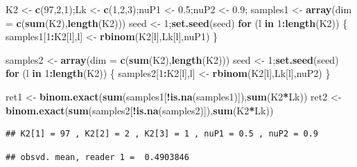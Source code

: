 \documentclass[
]{book}
\newenvironment{Shaded}{\begin{snugshade}}{\end{snugshade}}
\newcommand{\ControlFlowTok}[1]{\textcolor[rgb]{0.13,0.29,0.53}{\textbf{#1}}}
\newcommand{\DataTypeTok}[1]{\textcolor[rgb]{0.13,0.29,0.53}{#1}}
\newcommand{\DecValTok}[1]{\textcolor[rgb]{0.00,0.00,0.81}{#1}}
\newcommand{\FloatTok}[1]{\textcolor[rgb]{0.00,0.00,0.81}{#1}}
\newcommand{\KeywordTok}[1]{\textcolor[rgb]{0.13,0.29,0.53}{\textbf{#1}}}
\newcommand{\NormalTok}[1]{#1}
\newcommand{\OperatorTok}[1]{\textcolor[rgb]{0.81,0.36,0.00}{\textbf{#1}}}
\newcommand{\StringTok}[1]{\textcolor[rgb]{0.31,0.60,0.02}{#1}}
\begin{document}
\begin{Shaded}
\begin{Highlighting}[]
\NormalTok{K2 <-}\StringTok{ }\KeywordTok{c}\NormalTok{(}\DecValTok{97}\NormalTok{,}\DecValTok{2}\NormalTok{,}\DecValTok{1}\NormalTok{);Lk <-}\StringTok{ }\KeywordTok{c}\NormalTok{(}\DecValTok{1}\NormalTok{,}\DecValTok{2}\NormalTok{,}\DecValTok{3}\NormalTok{);nuP1 <-}\StringTok{ }\FloatTok{0.5}\NormalTok{;nuP2 <-}\StringTok{ }\FloatTok{0.9}\NormalTok{;}
\NormalTok{samples1 <-}\StringTok{ }\KeywordTok{array}\NormalTok{(}\DataTypeTok{dim =} \KeywordTok{c}\NormalTok{(}\KeywordTok{sum}\NormalTok{(K2),}\KeywordTok{length}\NormalTok{(K2)))}
\NormalTok{seed <-}\StringTok{ }\DecValTok{1}\NormalTok{;}\KeywordTok{set.seed}\NormalTok{(seed)}
\ControlFlowTok{for}\NormalTok{ (l }\ControlFlowTok{in} \DecValTok{1}\OperatorTok{:}\KeywordTok{length}\NormalTok{(K2)) \{}
\NormalTok{  samples1[}\DecValTok{1}\OperatorTok{:}\NormalTok{K2[l],l] <-}\StringTok{ }\KeywordTok{rbinom}\NormalTok{(K2[l],Lk[l],nuP1)}
\NormalTok{\}}

\NormalTok{samples2 <-}\StringTok{ }\KeywordTok{array}\NormalTok{(}\DataTypeTok{dim =} \KeywordTok{c}\NormalTok{(}\KeywordTok{sum}\NormalTok{(K2),}\KeywordTok{length}\NormalTok{(K2)))}
\NormalTok{seed <-}\StringTok{ }\DecValTok{1}\NormalTok{;}\KeywordTok{set.seed}\NormalTok{(seed)}
\ControlFlowTok{for}\NormalTok{ (l }\ControlFlowTok{in} \DecValTok{1}\OperatorTok{:}\KeywordTok{length}\NormalTok{(K2)) \{}
\NormalTok{  samples2[}\DecValTok{1}\OperatorTok{:}\NormalTok{K2[l],l] <-}\StringTok{ }\KeywordTok{rbinom}\NormalTok{(K2[l],Lk[l],nuP2)}
\NormalTok{\}}

\NormalTok{ret1 <-}\StringTok{ }\KeywordTok{binom.exact}\NormalTok{(}\KeywordTok{sum}\NormalTok{(samples1[}\OperatorTok{!}\KeywordTok{is.na}\NormalTok{(samples1)]),}\KeywordTok{sum}\NormalTok{(K2}\OperatorTok{*}\NormalTok{Lk))}
\NormalTok{ret2 <-}\StringTok{ }\KeywordTok{binom.exact}\NormalTok{(}\KeywordTok{sum}\NormalTok{(samples2[}\OperatorTok{!}\KeywordTok{is.na}\NormalTok{(samples2)]),}\KeywordTok{sum}\NormalTok{(K2}\OperatorTok{*}\NormalTok{Lk))}
\end{Highlighting}
\end{Shaded}

\begin{verbatim}
## K2[1] = 97 , K2[2] = 2 , K2[3] = 1 , nuP1 = 0.5 , nuP2 = 0.9
\end{verbatim}

\begin{verbatim}
## obsvd. mean, reader 1 =  0.4903846
\end{verbatim}
\end{document}

